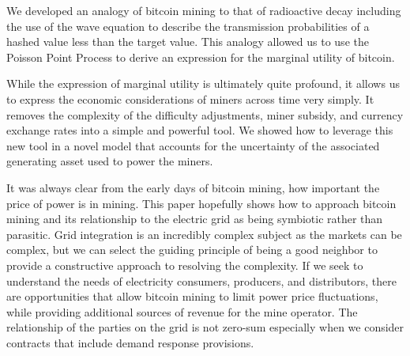 \documentclass[runningheads]{llncs}
\begin{document}
We developed an analogy of bitcoin mining to that of radioactive decay including the use of the wave equation to describe the transmission probabilities of a hashed value less than the target value.
This analogy allowed us to use the Poisson Point Process to derive an expression for the marginal utility of bitcoin.

While the expression of marginal utility is ultimately quite profound, it allows us to express the economic considerations of miners across time very simply.
It removes the complexity of the difficulty adjustments, miner subsidy, and currency exchange rates into a simple and powerful tool.
We showed how to leverage this new tool in a novel model that accounts for the uncertainty of the associated generating asset used to power the miners.

It was always clear from the early days of bitcoin mining, how important the price of power is in mining.
This paper hopefully shows how to approach bitcoin mining and its relationship to the electric grid as being symbiotic rather than parasitic.
Grid integration is an incredibly complex subject as the markets can be complex, but we can select the guiding principle of being a good neighbor to provide a constructive approach to resolving the complexity.
If we seek to understand the needs of electricity consumers, producers, and distributors, there are opportunities that allow bitcoin mining to limit power price fluctuations, while providing additional sources of revenue for the mine operator.
The relationship of the parties on the grid is not zero-sum especially when we consider contracts that include demand response provisions. 


%
%


\end{document}
